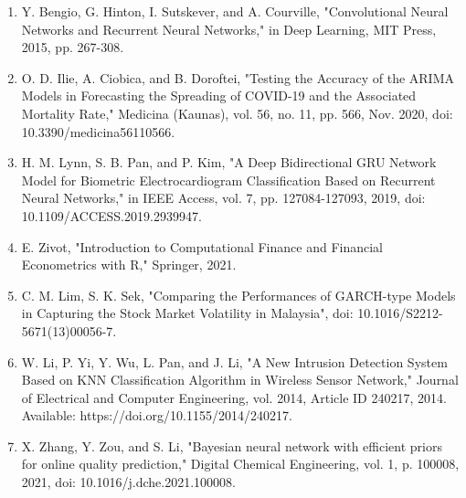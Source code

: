 \documentclass{ieeeojies}
\begin{document}
\begin{enumerate}
    \item Y. Bengio, G. Hinton, I. Sutskever, and A. Courville, "Convolutional Neural Networks and Recurrent Neural Networks," in Deep Learning, MIT Press, 2015, pp. 267-308.
    \item O. D. Ilie, A. Ciobica, and B. Doroftei, "Testing the Accuracy of the ARIMA Models in Forecasting the Spreading of COVID-19 and the Associated Mortality Rate," Medicina (Kaunas), vol. 56, no. 11, pp. 566, Nov. 2020, doi: 10.3390/medicina56110566.
    \item H. M. Lynn, S. B. Pan, and P. Kim, "A Deep Bidirectional GRU Network Model for Biometric Electrocardiogram Classification Based on Recurrent Neural Networks," in IEEE Access, vol. 7, pp. 127084-127093, 2019, doi: 10.1109/ACCESS.2019.2939947.
    \item  E. Zivot, "Introduction to Computational Finance and Financial Econometrics with R," Springer, 2021.
    \item C. M. Lim, S. K. Sek, "Comparing the Performances of GARCH-type Models in Capturing the Stock Market Volatility in Malaysia", doi: 10.1016/S2212-5671(13)00056-7.
    \item W. Li, P. Yi, Y. Wu, L. Pan, and J. Li, "A New Intrusion Detection System Based on KNN Classification Algorithm in Wireless Sensor Network," Journal of Electrical and Computer Engineering, vol. 2014, Article ID 240217, 2014. Available: https://doi.org/10.1155/2014/240217.
    \item X. Zhang, Y. Zou, and S. Li, "Bayesian neural network with efficient priors for online quality prediction," Digital Chemical Engineering, vol. 1, p. 100008, 2021, doi: 10.1016/j.dche.2021.100008.

\end{enumerate}


\end{document}
